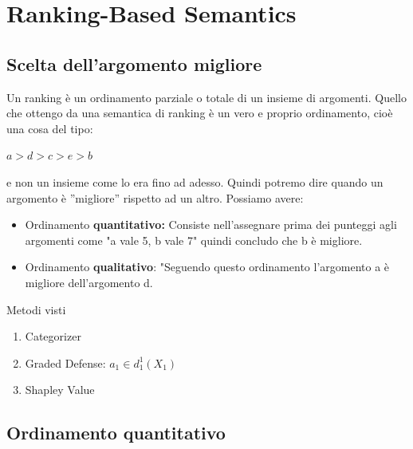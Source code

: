 \chapter{Ranking-Based Semantics} \label{Ranking-Based Semantics}
\section{Scelta dell’argomento migliore}
Un ranking è un ordinamento parziale o totale di un insieme di argomenti. Quello che ottengo da una semantica di ranking è un vero e proprio ordinamento, cioè una cosa del tipo:
\begin{center}
    $a > d > c > e >b$
\end{center}
e non un insieme come lo era fino ad adesso. Quindi potremo dire quando un argomento è ”migliore” rispetto ad un altro. Possiamo avere:
\begin{itemize}
    \item Ordinamento \textbf{quantitativo:} Consiste nell’assegnare prima dei punteggi agli argomenti come "a vale 5, b vale 7" quindi concludo che b è migliore.
    \item Ordinamento \textbf{qualitativo}: "Seguendo questo ordinamento l’argomento a è migliore dell’argomento d.
\end{itemize}
\begin{center}
    Metodi visti
\end{center}
\begin{enumerate}
    \item Categorizer
    \item Graded Defense: $a_1 \in d^1_{1} (X_1)$
    \item Shapley Value
\end{enumerate}
\section{Ordinamento quantitativo}
